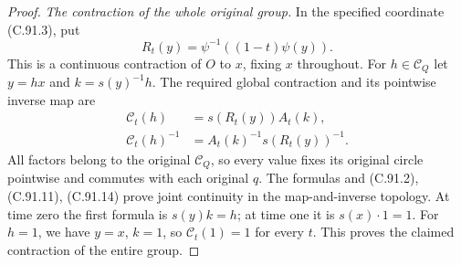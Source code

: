 \begin{proof}
\emph{The contraction of the whole original group.}
In the specified coordinate (C.91.3), put
\[
             R_t(y)=\psi^{-1}((1-t)\psi(y)).                   \tag{C.91.14}
\]
This is a continuous contraction of $O$ to $x$,
fixing $x$ throughout.  For $h\in\mathscr C_Q$ let
$y=hx$ and $k=s(y)^{-1}h$.  The required global
contraction and its pointwise inverse map are
\[
 \begin{aligned}
 \mathcal C_t(h)&=s(R_t(y))A_t(k),\\
 \mathcal C_t(h)^{-1}&=A_t(k)^{-1}s(R_t(y))^{-1}.
 \end{aligned}                                                    \tag{C.91.15}
\]
All factors belong to the original $\mathscr C_Q$,
so every value fixes its original circle pointwise
and commutes with each original $q$.
The formulas and (C.91.2), (C.91.11), (C.91.14) prove
joint continuity in the map-and-inverse topology.
At time zero the first formula is $s(y)k=h$;
at time one it is $s(x)\cdot1=1$.
For $h=1$, we have $y=x$, $k=1$, so
$\mathcal C_t(1)=1$ for every $t$.
This proves the claimed contraction of the entire group.
\end{proof}
